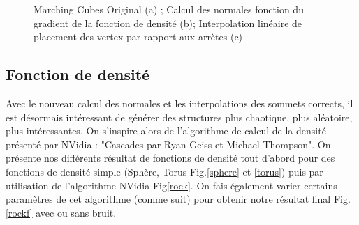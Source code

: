 \documentclass[a4paper]{article}
\begin{document}
\begin{figure}[H]
\centering
{}
\caption{Marching Cubes Original (a) ; Calcul des normales fonction du gradient de la fonction de densité (b); Interpolation linéaire de placement des vertex par rapport aux arrètes (c)}
\end{figure}


\subsection{Fonction de densité}

Avec le nouveau calcul des normales et les interpolations des sommets corrects, il est désormais intéressant de générer des structures plus chaotique, plus aléatoire, plus intéressantes. On s'inspire alors de l'algorithme de calcul de la densité présenté par NVidia : "Cascades par Ryan Geiss et Michael Thompson". On présente nos différents résultat de fonctions de densité tout d'abord pour des fonctions de densité simple (Sphère, Torus Fig.\ref{sphere} et \ref{torus}) puis par utilisation de l'algorithme NVidia Fig\ref{rock}. On fais également varier certains paramètres de cet algorithme (comme suit) pour obtenir notre résultat final Fig.\ref{rockf} avec ou sans bruit.
\end{document}
